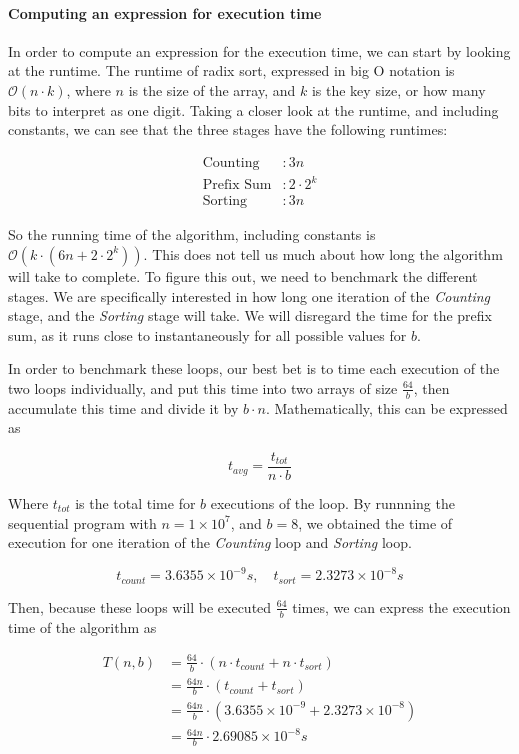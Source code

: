 \documentclass{article}
\begin{document}
\paragraph{Computing an expression for execution time}
In order to compute an expression for the execution time, we can start by looking at the runtime. The runtime of radix sort, expressed in big O notation is \( \mathcal{O}\left(n \cdot  k\right) \), where \( n \) is the size of the array, and \( k \) is the key size, or how many bits to interpret as one digit. Taking a closer look at the runtime, and including constants, we can see that the three stages have the following runtimes:

\begin{align*}
    \text{Counting} & : 3n \\
    \text{Prefix Sum} & : 2 \cdot 2^{k} \\
    \text{Sorting} & : 3n
\end{align*}

So the running time of the algorithm, including constants is \( \mathcal{O}\left(k \cdot \left( 6n + 2 \cdot 2^{k} \right)\right) \). This does not tell us much about how long the algorithm will take to complete. To figure this out, we need to benchmark the different stages. We are specifically interested in how long one iteration of the \textit{Counting} stage, and the \textit{Sorting} stage will take. We will disregard the time for the prefix sum, as it runs close to instantaneously for all possible values for \( b \).
\medskip

In order to benchmark these loops, our best bet is to time each execution of the two loops individually, and put this time into two arrays of size \( \frac{64}{b} \), then accumulate this time and divide it by \( b \cdot n \). Mathematically, this can be expressed as

\[ t_{avg} = \frac{t_{tot}}{n \cdot  b} \]

Where \( t_{tot} \) is the total time for \( b \) executions of the loop. By runnning the sequential program with \( n = 1 \times 10^{7} \), and \( b = 8 \), we obtained the time of execution for one iteration of the \textit{Counting} loop and \textit{Sorting} loop.

\[ t_{count} = 3.6355 \times 10^{-9}s,\quad t_{sort} = 2.3273 \times  10^{-8} s \]

Then, because these loops will be executed \( \frac{64}{b}  \) times, we can express the execution time of the algorithm as

\begin{align*}
    T\left( n,b \right) &= \frac{64}{b} \cdot \left( n \cdot t_{count} + n \cdot t_{sort} \right) \\
                        &= \frac{64n}{b} \cdot \left( t_{count} + t_{sort} \right)\\
                        &= \frac{64n}{b} \cdot \left( 3.6355 \times 10^{-9} + 2.3273 \times  10^{-8} \right)\\
                        &= \frac{64n}{b} \cdot 2.69085 \times 10^{-8}s\\
\end{align*}
\end{document}
